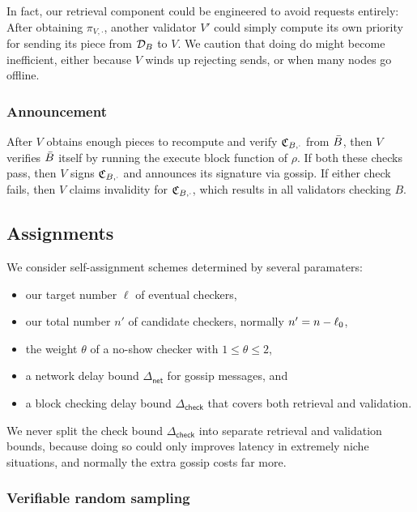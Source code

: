 In fact, our retrieval component could be engineered to avoid requests entirely:  After obtaining $\pi_{V,\cdot}$, another validator $V'$ could simply compute its own priority for sending its piece from $\mathcal{D}_B$ to $V$.  We caution that doing do might become inefficient, either because $V$ winds up rejecting sends, or when many nodes go offline.  

\subsubsection{Announcement}

After $V$ obtains enough pieces to recompute and verify $\mathfrak{C}_{B,\cdot}$ from $\bar{B}$, then $V$ verifies $\bar{B}$ itself by running the execute block function of $\rho$.  If both these checks pass, then $V$ signs $\mathfrak{C}_{B,\cdot}$ and announces its signature via gossip.  If either check fails, then $V$ claims invalidity for $\mathfrak{C}_{B,\cdot}$, which results in all validators checking $B$.


\subsection{Assignments}
\label{sec:assignment}

\newcommand\netdelay{\ensuremath{\Delta_{\mathsf{net}}}}
\newcommand\checkdelay{\ensuremath{\Delta_{\mathsf{check}}}}

We consider self-assignment schemes determined by several paramaters:
\begin{itemize}
\item our target number $\ell$ of eventual checkers,
\item our total number $n'$ of candidate checkers, normally $n' = n - \ell_0$,
\item the weight $\theta$ of a no-show checker with $1 \leq \theta \leq 2$,
\item a network delay bound $\netdelay$ for gossip messages, and
\item a block checking delay bound $\checkdelay$ that covers both retrieval and validation.
\end{itemize}
We never split the check bound $\checkdelay$ into separate retrieval and validation bounds, because doing so could only improves latency in extremely niche situations, and normally the extra gossip costs far more. 

\subsubsection{Verifiable random sampling}

